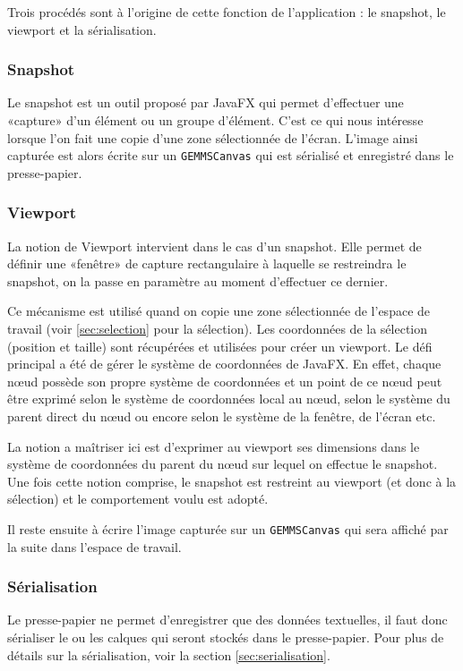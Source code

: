 Trois procédés sont à l'origine de cette fonction de l'application : le snapshot, le viewport et la sérialisation.

\subsubsection{Snapshot}
Le snapshot est un outil proposé par JavaFX qui permet d'effectuer une «capture» d'un élément ou un groupe d'élément. C'est ce qui nous intéresse lorsque l'on fait une copie d'une zone sélectionnée de l'écran. L'image ainsi capturée est alors écrite sur un \texttt{GEMMSCanvas} qui est sérialisé et enregistré dans le presse-papier.

\subsubsection{Viewport}
La notion de Viewport intervient dans le cas d'un snapshot. Elle permet de définir une «fenêtre» de capture rectangulaire à laquelle se restreindra le snapshot, on la passe en paramètre au moment d'effectuer ce dernier.

Ce mécanisme est utilisé quand on copie une zone sélectionnée de l'espace de travail (voir \ref{sec:selection} pour la sélection). Les coordonnées de la sélection (position et taille) sont récupérées et utilisées pour créer un viewport. Le défi principal a été de gérer le système de coordonnées de JavaFX. En effet, chaque n\oe ud possède son propre système de coordonnées et un point de ce n\oe ud peut être exprimé selon le système de coordonnées local au n\oe ud, selon le système du parent direct du n\oe ud ou encore selon le système de la fenêtre, de l'écran etc.

La notion a maîtriser ici est d'exprimer au viewport ses dimensions dans le système de coordonnées du parent du n\oe ud sur lequel on effectue le snapshot. Une fois cette notion comprise, le snapshot est restreint au viewport (et donc à la sélection) et le comportement voulu est adopté.

Il reste ensuite à écrire l'image capturée sur un \texttt{GEMMSCanvas} qui sera affiché par la suite dans l'espace de travail.

\subsubsection{Sérialisation}
Le presse-papier ne permet d'enregistrer que des données textuelles, il faut donc sérialiser le ou les calques qui seront stockés dans le presse-papier. Pour plus de détails sur la sérialisation, voir la section \ref{sec:serialisation}.

